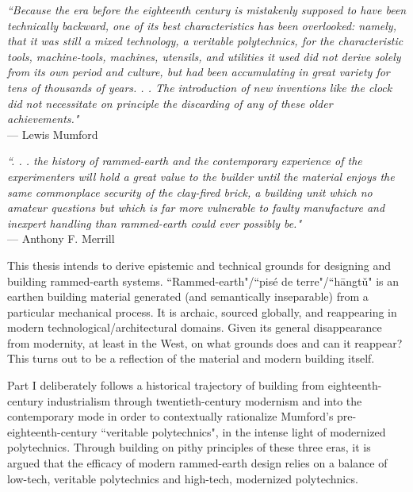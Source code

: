 \begin{flushright}
\small{
\textit{
``Because the era before the eighteenth century is mistakenly supposed to have been technically backward, one of its best characteristics has been overlooked: namely, that it was still a mixed technology, a veritable polytechnics, for the characteristic tools, machine-tools, machines, utensils, and utilities it used did not derive solely from its own period and culture, but had been accumulating in great variety for tens of thousands of years. . . The introduction of new inventions like the clock did not necessitate on principle the discarding of any of these older achievements."}}
\\ --- Lewis Mumford \cite[p.134]{MYTHMACHINE}
\end{flushright}

\begin{flushright}
  \small{
  \textit{``. . . the history of rammed-earth and the contemporary
experience of the experimenters will hold a great value to
the builder until the material enjoys the same commonplace
security of the clay-fired brick, a building unit which no
amateur questions but which is far more vulnerable to
faulty manufacture and inexpert handling than rammed-earth
could ever possibly be."}}\\
–-- Anthony F. Merrill \cite[p.xvi]{RAMMEDEARTHHOUSE}
\end{flushright}

This thesis intends to derive epistemic and technical grounds for designing and building rammed-earth systems. ``Rammed-earth"/``pis\'e de terre"/``h\=angt\v u" is an earthen building material generated (and semantically inseparable) from a particular mechanical process. It is archaic, sourced globally, and reappearing in modern technological/architectural domains. Given its general disappearance from modernity, at least in the West, on what grounds does and can it reappear? This turns out to be a reflection of the material and modern building itself.

Part I deliberately follows a historical trajectory of building from eighteenth-century industrialism through twentieth-century modernism and into the contemporary mode in order to contextually rationalize Mumford's pre-eighteenth-century ``veritable polytechnics", in the intense light of modernized polytechnics. Through building on pithy principles of these three eras, it is argued that the efficacy of modern rammed-earth design relies on a balance of low-tech, veritable polytechnics and high-tech, modernized polytechnics.

